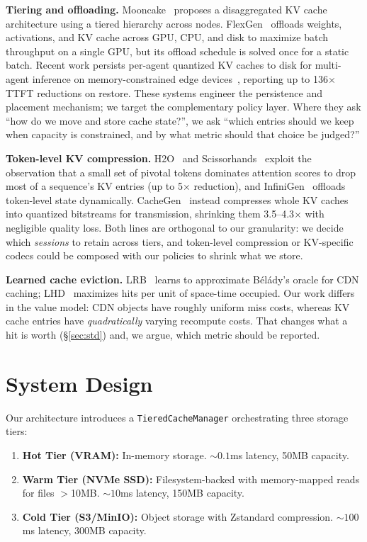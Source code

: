 \documentclass[letterpaper,twocolumn,10pt]{article}
\begin{document}
\textbf{Tiering and offloading.} Mooncake~\cite{qin2025mooncake} proposes a disaggregated KV cache architecture using a tiered hierarchy across nodes. FlexGen~\cite{sheng2023flexgen} offloads weights, activations, and KV cache across GPU, CPU, and disk to maximize batch throughput on a single GPU, but its offload schedule is solved once for a static batch. Recent work persists per-agent quantized KV caches to disk for multi-agent inference on memory-constrained edge devices~\cite{shkolnikov2026agentmemory}, reporting up to 136$\times$ TTFT reductions on restore. These systems engineer the persistence and placement mechanism; we target the complementary policy layer. Where they ask ``how do we move and store cache state?'', we ask ``which entries should we keep when capacity is constrained, and by what metric should that choice be judged?''

\textbf{Token-level KV compression.} H2O~\cite{zhang2023h2o} and Scissorhands~\cite{liu2023scissorhands} exploit the observation that a small set of pivotal tokens dominates attention scores to drop most of a sequence's KV entries (up to 5$\times$ reduction), and InfiniGen~\cite{lee2024infinigen} offloads token-level state dynamically. CacheGen~\cite{liu2024cachegen} instead compresses whole KV caches into quantized bitstreams for transmission, shrinking them 3.5--4.3$\times$ with negligible quality loss. Both lines are orthogonal to our granularity: we decide which \emph{sessions} to retain across tiers, and token-level compression or KV-specific codecs could be composed with our policies to shrink what we store.

\textbf{Learned cache eviction.} LRB~\cite{song2020lrb} learns to approximate B\'{e}l\'{a}dy's oracle for CDN caching; LHD~\cite{beckmann2018lhd} maximizes hits per unit of space-time occupied. Our work differs in the value model: CDN objects have roughly uniform miss costs, whereas KV cache entries have \emph{quadratically} varying recompute costs. That changes what a hit is worth (\S\ref{sec:std}) and, we argue, which metric should be reported.

\section{System Design}

Our architecture introduces a \texttt{TieredCacheManager} orchestrating three storage tiers:

\begin{enumerate}
  \item \textbf{Hot Tier (VRAM):} In-memory storage. ${\sim}0.1$ms latency, 50MB capacity.
  \item \textbf{Warm Tier (NVMe SSD):} Filesystem-backed with memory-mapped reads for files $>$10MB. ${\sim}10$ms latency, 150MB capacity.
  \item \textbf{Cold Tier (S3/MinIO):} Object storage with Zstandard compression. ${\sim}100$ms latency, 300MB capacity.
\end{enumerate}
\end{document}
